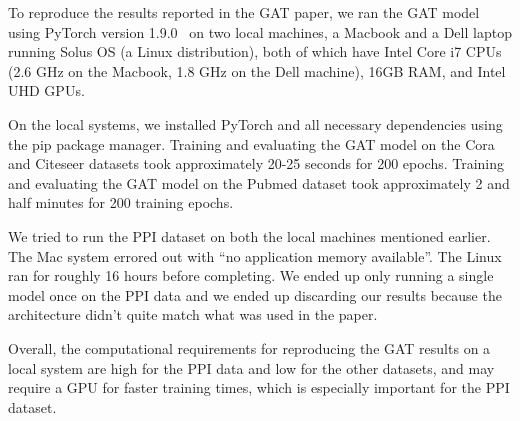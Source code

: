 To reproduce the results reported in the GAT paper, we ran the GAT model using
PyTorch version 1.9.0~\cite{paszke2019pytorch} on two local machines, a Macbook
and a Dell laptop running Solus OS (a Linux distribution), both of which have
Intel Core i7 CPUs (2.6 GHz on the Macbook, 1.8 GHz on the Dell machine), 16GB
RAM, and Intel UHD GPUs.

On the local systems, we installed PyTorch and all necessary dependencies using
the pip package manager. Training and evaluating the GAT model on the Cora and
Citeseer datasets took approximately 20-25 seconds for 200 epochs. Training and
evaluating the GAT model on the Pubmed dataset took approximately 2 and half
minutes for 200 training epochs.

We tried to run the PPI dataset on both the local machines mentioned earlier.
The Mac system errored out with ``no application memory available''. The Linux
ran for roughly 16 hours before completing. We ended up only running a single
model once on the PPI data and we ended up discarding our results because the
architecture didn't quite match what was used in the paper.

Overall, the computational requirements for reproducing the GAT results on a
local system are high for the PPI data and low for the other datasets, and may
require a GPU for faster training times, which is especially important for the
PPI dataset.
